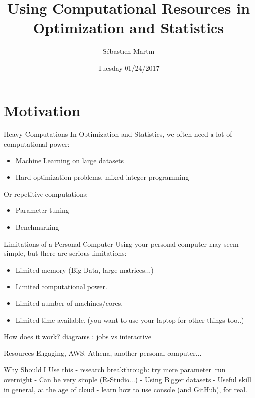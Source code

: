 \documentclass{beamer}
\title[IAP-2017]{Using Computational Resources in Optimization and Statistics}
\author{Sébastien Martin}
\institute{MIT}
\date{Tuesday 01/24/2017}
\begin{document}
\begin{frame}
  \titlepage
\end{frame}


\section{Motivation}

\begin{frame}{Heavy Computations}
  In Optimization and Statistics, we often need a lot of computational power:
  \begin{itemize}
    \item Machine Learning on large datasets
    \item Hard optimization problems, mixed integer programming
  \end{itemize}
  \pause
  Or repetitive computations:
  \begin{itemize}
    \item Parameter tuning
    \item Benchmarking
  \end{itemize}
\end{frame}

\begin{frame}{Limitations of a Personal Computer}
  Using your personal computer may seem simple, but there are serious limitations:
  \begin{itemize}
    \item<1-> Limited \alert{memory} (Big Data, large matrices...)
    \item<2-> Limited \alert{computational power}.
    \item<3-> Limited \alert{number of machines}/cores.
    \item<4-> Limited \alert{time} available. (you want to use your laptop for other things too..)
  \end{itemize}
\end{frame}

\begin{frame}{How does it work?}
    diagrams : jobs vs interactive
\end{frame}

\begin{frame}{Resources}
  Engaging, AWS, Athena, another personal computer...
\end{frame}

\begin{frame}{Why Should I Use this}
  - research breakthrough: try more parameter, run overnight
  - Can be very simple (R-Studio...)
  - Using Bigger datasets
  - Useful skill in general, at the age of cloud
  - learn how to use console (and GitHub), for real.
\end{frame}
\end{document}
